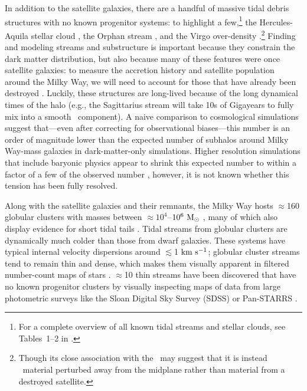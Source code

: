 In addition to the satellite galaxies, there are a handful of massive tidal
debris structures with no known progenitor systems: to highlight a
few,\footnote{For a complete overview of all known tidal streams and stellar
clouds, see Tables~1--2 in \cite{grillmair16}.} the Hercules-Aquila stellar
cloud \citep{belokurov07b}, the Orphan stream \citep{grillmair06b}, and the
Virgo over-density \citep{juric08}.\footnote{Though its close association with
the \mwdisk\ may suggest that it is instead \mwdisk\ material perturbed away
from the midplane rather than material from a destroyed satellite.} Finding and
modeling streams and substructure is important because they constrain the dark
matter distribution, but also because many of these features were once satellite
galaxies: to measure the accretion history and satellite population around the
Milky Way, we will need to account for those that have already been destroyed
\citep[e.g.,][]{johnston08}. Luckily, these structures are long-lived because of
the long dynamical times of the halo (e.g., the Sagittarius stream will take 10s
of Gigayears to fully mix into a smooth \mwhalo\ component). A naive comparison
to cosmological simulations suggest that---even after correcting for
observational biases---this number is an order of magnitude lower than the
expected number of subhalos around Milky Way-mass galaxies in dark-matter-only
simulations. Higher resolution simulations that include baryonic physics appear
to shrink this expected number to within a factor of a few of the observed
number \citep[e.g.,][]{zolotov12, brooks13,sawala16}, however, it is not known
whether this tension has been fully resolved.

Along with the satellite galaxies and their remnants, the Milky Way hosts
$\approx$160 globular clusters with masses between $\approx$$10^4$--$10^6~\mathrm{M}_\odot$
\citep{harris10}, many of which also display evidence for short tidal tails
\citep{grillmair95, leon00}. Tidal streams from globular clusters are
dynamically much colder than those from dwarf galaxies. These systems have
typical internal velocity dispersions around $\lesssim$1$~\mathrm{km}~\mathrm{s}^{-1}$; globular
cluster streams tend to remain thin and dense, which makes them visually
apparent in filtered number-count maps of stars \citep{grillmair08}. $\approx$10
thin streams have been discovered that have no known progenitor clusters by
visually inspecting maps of data from large photometric surveys like the Sloan
Digital Sky Survey (SDSS) or Pan-STARRS \citep[e.g.,][]{grillmair06a, bonaca12,
bernard14}.

